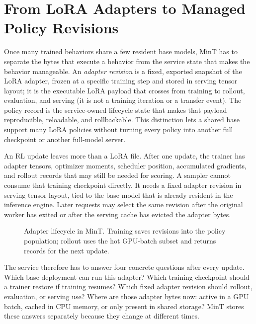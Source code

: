 \section{From LoRA Adapters to Managed Policy Revisions}

Once many trained behaviors share a few resident base models, MinT has to separate the bytes that execute a behavior from the service state that makes the behavior manageable. An \emph{adapter revision} is a fixed, exported snapshot of the LoRA adapter, frozen at a specific training step and stored in serving tensor layout; it is the executable LoRA payload that crosses from training to rollout, evaluation, and serving (it is not a training iteration or a transfer event). The policy record is the service-owned lifecycle state that makes that payload reproducible, reloadable, and rollbackable. This distinction lets a shared base support many LoRA policies without turning every policy into another full checkpoint or another full-model server.

An RL update leaves more than a LoRA file. After one update, the trainer has adapter tensors, optimizer moments, scheduler position, accumulated gradients, and rollout records that may still be needed for scoring. A sampler cannot consume that training checkpoint directly. It needs a fixed adapter revision in serving tensor layout, tied to the base model that is already resident in the inference engine. Later requests may select the same revision after the original worker has exited or after the serving cache has evicted the adapter bytes.

\begin{figure}
    \vspace{-0.7\baselineskip}
    \centering
    \resizebox{\linewidth}{!}{}
    \caption{Adapter lifecycle in MinT. Training saves revisions into the policy population; rollout uses the hot GPU-batch subset and returns records for the next update.}
    \label{fig:policy_lifecycle}
    \vspace{-0.6\baselineskip}
\end{figure}

The service therefore has to answer four concrete questions after every update. Which base deployment can run this adapter? Which training checkpoint should a trainer restore if training resumes? Which fixed adapter revision should rollout, evaluation, or serving use? Where are those adapter bytes now: active in a GPU batch, cached in CPU memory, or only present in shared storage? MinT stores these answers separately because they change at different times.

